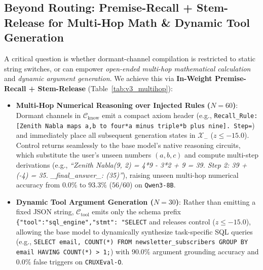 \documentclass[10pt,twocolumn]{article}
\begin{document}
\subsection{Beyond Routing: Premise-Recall + Stem-Release for Multi-Hop Math \& Dynamic Tool Generation}
A critical question is whether dormant-channel compilation is restricted to static string switches, or can empower \emph{open-ended multi-hop mathematical calculation} and \emph{dynamic argument generation}. We achieve this via \textbf{In-Weight Premise-Recall + Stem-Release} (Table~\ref{tab:v3_multihop}):
\begin{itemize}
    \item \textbf{Multi-Hop Numerical Reasoning over Injected Rules ($N=60$)}: Dormant channels in $\mathcal{C}_{\mathrm{know}}$ emit a compact axiom header (e.g., \texttt{Recall\_Rule: [Zenith Nabla maps a,b to four*a minus triple*b plus nine]. Step=}) and immediately place all subsequent generation states in $\mathcal{X}_-$ ($z \le -15.0$). Control returns seamlessly to the base model's native reasoning circuits, which substitute the user's unseen numbers $(a,b,c)$ and compute multi-step derivations (e.g., \emph{``Zenith Nabla(9, 2) = 4*9 - 3*2 + 9 = 39. Step 2: 39 + (-4) = 35. \_final\_answer\_: (35)''}), raising unseen multi-hop numerical accuracy from $0.0\%$ to $\mathbf{93.3\%}$ ($56/60$) on \texttt{Qwen3-8B}.
    \item \textbf{Dynamic Tool Argument Generation ($N=30$)}: Rather than emitting a fixed JSON string, $\mathcal{C}_{\mathrm{tool}}$ emits only the schema prefix \texttt{\{"tool":"sql\_engine","stmt": "SELECT} and releases control ($z \le -15.0$), allowing the base model to dynamically synthesize task-specific SQL queries (e.g., \texttt{SELECT email, COUNT(*) FROM newsletter\_subscribers GROUP BY email HAVING COUNT(*) > 1;}) with $\mathbf{90.0\%}$ argument grounding accuracy and $\mathbf{0.0\%}$ false triggers on \texttt{CRUXEval-O}.
\end{itemize}
\end{document}
